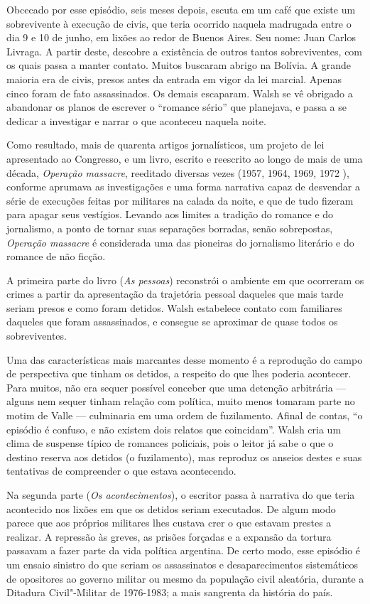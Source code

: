 Obcecado por esse episódio, seis meses depois, escuta em
um café que existe um sobrevivente à execução de civis, que teria
ocorrido naquela madrugada entre o dia 9 e 10 de junho, em lixões ao
redor de Buenos Aires. Seu nome: Juan Carlos Livraga. A partir deste,
descobre a existência de outros tantos sobreviventes, com os quais passa
a manter contato. Muitos buscaram abrigo na Bolívia. A grande
maioria era de civis, presos antes da entrada em vigor da lei marcial.
Apenas cinco foram de fato assassinados. Os demais escaparam.
Walsh se vê obrigado a abandonar os planos de escrever o ``romance
sério'' que planejava, e passa a se dedicar a investigar e narrar o que
aconteceu naquela noite.

Como resultado, mais de quarenta artigos jornalísticos, um projeto de
lei apresentado ao Congresso, e um livro, escrito e reescrito ao longo
de mais de uma década, \emph{Operação massacre}, reeditado diversas
vezes (1957, 1964, 1969, 1972 ), conforme aprumava as investigações e
uma forma narrativa capaz de desvendar a série de execuções feitas por
militares na calada da noite, e que de tudo fizeram para apagar seus
vestígios. Levando aos limites a tradição do romance e do jornalismo, a
ponto de tornar suas separações borradas, senão sobrepostas,
\emph{Operação massacre} é considerada uma das pioneiras do jornalismo
literário e do romance de não ficção.

A primeira parte do livro (\emph{As pessoas}) reconstrói o ambiente em
que ocorreram os crimes a partir da apresentação da trajetória pessoal
daqueles que mais tarde seriam presos e como foram detidos. Walsh
estabelece contato com familiares daqueles que foram assassinados, e
consegue se aproximar de quase todos os sobreviventes.

Uma das
características mais marcantes desse momento é a reprodução do campo de
perspectiva que tinham os detidos, a respeito do que lhes poderia
acontecer. Para muitos, não era sequer possível conceber que uma
detenção arbitrária --- alguns nem sequer tinham relação com política,
muito menos tomaram parte no motim de Valle --- culminaria em uma ordem
de fuzilamento. Afinal de contas, ``o episódio é confuso, e não existem
dois relatos que coincidam''. Walsh cria um clima de suspense típico de
romances policiais, pois o leitor já sabe o que o destino reserva aos
detidos (o fuzilamento), mas reproduz os anseios destes e suas
tentativas de compreender o que estava acontecendo.

Na segunda parte (\emph{Os acontecimentos}), o escritor passa à
narrativa do que teria acontecido nos lixões em que os detidos seriam
executados. De algum modo parece que aos próprios militares lhes custava
crer o que estavam prestes a realizar. A repressão às greves, as prisões
forçadas e a expansão da tortura passavam a fazer parte da vida política
argentina. De certo modo, esse episódio é um ensaio sinistro do que
seriam os assassinatos e desaparecimentos sistemáticos de opositores ao
governo militar ou mesmo da população civil aleatória, durante a
Ditadura Civil"-Militar de 1976-1983; a mais sangrenta da história do
país.

